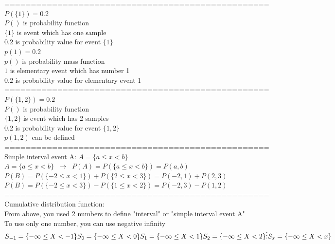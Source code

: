 \documentclass{article}
\begin{document}
================================================== \\
$P(\{1\})=0.2$ \\ 
$P()$ is probability function \\ 
$\{1\}$ is event which has one sample \\ 
$0.2$ is probability value for event $\{1\}$ \\ 

$p(1)=0.2$ \\ 
$p()$ is probability mass function \\ 
$1$ is elementary event which has number 1 \\ 
$0.2$ is probability value for elementary event 1 \\ 

================================================== \\
$P(\{1,2\})=0.2$ \\ 
$P()$ is probability function \\ 
$\{1,2\}$ is event which has 2 samples \\ 
$0.2$ is probability value for event $\{1,2\}$ \\ 

$p(1,2)$ can be defined \\ 

================================================== \\
Simple interval event A: $A=\{a\le x <b\}$ \\ 

$A = \{ a \leq x < b \} \;\; \rightarrow \;\; P(A) = P(\{ a \leq x < b \}) = P(a, b)$ \\ 

$P(B) = P(\{ -2 \leq x < 1\}) + P(\{2 \leq x < 3\}) = P(-2, 1) + P(2, 3)$ \\ 

$P(B) = P(\{ -2 \leq x < 3 \}) - P(\{ 1 \leq x < 2\}) = P(-2, 3) - P(1, 2)$ \\ 

================================================== \\
Cumulative distribution function: \\ 
From above, you used 2 numbers to define "interval" or "simple interval event A" \\ 

To use only one number, you can use negative infinity \\ 

$
S_{-1} = \{ -\infty \leq X < -1 \} \\
S_{0} = \{ -\infty \leq X < 0 \} \\
S_{1} = \{ -\infty \leq X < 1 \} \\
S_{2} = \{ -\infty \leq X < 2 \} \\
\vdots \\
S_{x} = \{ -\infty \leq X < x \} \\$
\end{document}
